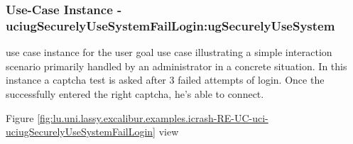 
	\subsubsection{Use-Case Instance - uciugSecurelyUseSystemFailLogin:ugSecurelyUseSystem}
	
	use case instance for the user goal use case  illustrating a simple interaction scenario primarily handled by an administrator in a concrete situation.
	In this instance a captcha test is asked after 3 failed attempts of login. Once the  successfully entered the right captcha, he's able to connect. 
	\begin{operationmodel}
	
	\end{operationmodel} 

	
	Figure \ref{fig:lu.uni.lassy.excalibur.examples.icrash-RE-UC-uci-uciugSecurelyUseSystemFailLogin}
	view
	
